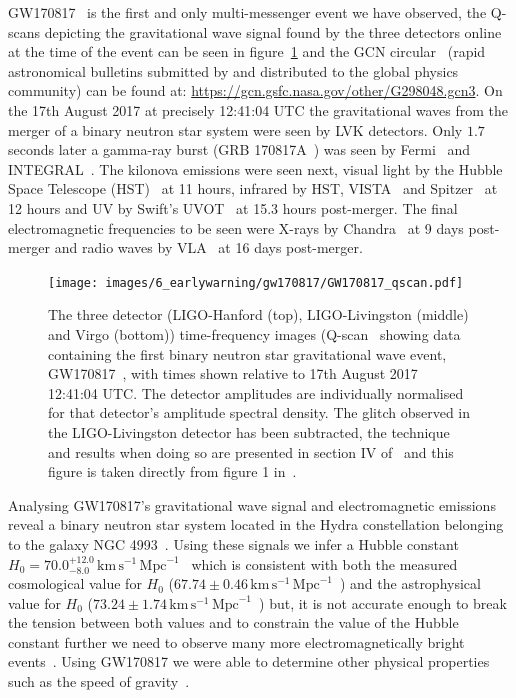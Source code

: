 GW170817~\cite{GW170817:2017} is the first and only multi-messenger event we have observed, the Q-scans depicting the gravitational wave signal found by the three detectors online at the time of the event can be seen in figure~\ref{6:fig:gw170817_qscan} and the GCN circular~\cite{gcn_circulars:2024} (rapid astronomical bulletins submitted by and distributed to the global physics community) can be found at: \href{https://gcn.gsfc.nasa.gov/other/G298048.gcn3}{https://gcn.gsfc.nasa.gov/other/G298048.gcn3}. On the 17th August 2017 at precisely 12:41:04 UTC the gravitational waves from the merger of a binary neutron star system were seen by LVK detectors. Only $1.7$ seconds later a gamma-ray burst (GRB 170817A~\cite{gw170817_joint:2017}) was seen by Fermi~\cite{Fermi:2022, Fermi_GW170817:2017} and INTEGRAL~\cite{INTEGRAL:2003, INTEGRAL_GW170817:2017}. The kilonova emissions were seen next, visual light by the Hubble Space Telescope (HST)~\cite{HST:2000, HST_GW170817:2021} at 11 hours, infrared by HST, VISTA~\cite{VISTA:2015, VISTA_GW170817:2017} and Spitzer~\cite{Spitzer:2004, Spitzer_GW170817:2018} at 12 hours and UV by Swift's UVOT~\cite{Swift:2004, Swift_GW170817:2017} at 15.3 hours post-merger. The final electromagnetic frequencies to be seen were X-rays by Chandra~\cite{Chandra_GW170817:2017} at 9 days post-merger and radio waves by VLA~\cite{VLA:2019, VLA_GW170817:2017} at 16 days post-merger.
%
\begin{figure}
    \centering
    \texttt{[image: images/6\_earlywarning/gw170817/GW170817\_qscan.pdf]}
    \caption{The three detector (LIGO-Hanford (top), LIGO-Livingston (middle) and Virgo (bottom)) time-frequency images (Q-scan~\cite{qscan:2004} showing data containing the first binary neutron star gravitational wave event, GW170817~\cite{GW170817:2017}, with times shown relative to 17th August 2017 12:41:04 UTC. The detector amplitudes are individually normalised for that detector's amplitude spectral density. The glitch observed in the LIGO-Livingston detector has been subtracted, the technique and results when doing so are presented in section IV of~\cite{GW170817:2017} and this figure is taken directly from figure 1 in~\cite{GW170817:2017}.}
    \label{6:fig:gw170817_qscan}
\end{figure}
%

Analysing GW170817's gravitational wave signal and electromagnetic emissions reveal a binary neutron star system located in the Hydra constellation belonging to the galaxy NGC 4993~\cite{NGC4993:1998}. Using these signals we infer a Hubble constant $H_0 = 70.0^{+12.0}_{-8.0} \, \text{km} \, \text{s}^{-1} \,\text{Mpc}^{-1}$~\cite{GW170817_H0:2017} which is consistent with both the measured cosmological value for $H_0$ ($67.74 \pm0.46 \, \text{km} \, \text{s}^{-1} \,\text{Mpc}^{-1}$~\cite{Planck_H0:2015}) and the astrophysical value for $H_0$ ($73.24 \pm1.74 \, \text{km} \, \text{s}^{-1} \,\text{Mpc}^{-1}$~\cite{Riess_H0:2016}) but, it is not accurate enough to break the tension between both values and to constrain the value of the Hubble constant further we need to observe many more electromagnetically bright events~\cite{Palmese:2021}. Using GW170817 we were able to determine other physical properties such as the speed of gravity~\cite{Harry_speed_of_gravity:2022, Baker_speed_of_gravity:2022}.

